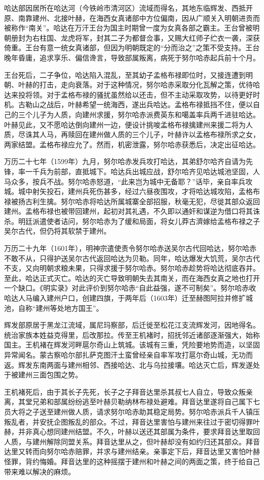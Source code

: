 哈达部因居所在哈达河（今铁岭市清河区）流域而得名，其地东临辉发、西抵开原、南靠建州、北接叶赫，在海西女真诸部中方位偏南，因从广顺关入明朝进贡而被称作“南关”。哈达在万汗王台为国主时期曾一度为女真各部之霸主。王台曾被明朝册封为右柱国、龙虎将军，封其二子为都督佥事，又赐大红师子纻衣一袭，深获倚重。王台有意一统女真诸部，但因为明朝既定的“分而治之”之策不受支持。王台晚年昏庸，追求享乐、偏信谗言，导致部属叛离，病死于努尔哈赤起兵前十个月。

王台死后，二子争位，哈达陷入混乱，至其幼子孟格布禄即位时，又接连遭到明朝、叶赫的打击，走向衰落。对于这种情况，努尔哈赤采取分化瓦解之策，优待哈达来投将领。对于孟格布禄的骚扰虽然给以还击，但不主动采取攻势，以待更好时机。古勒山之战后，叶赫希望一统海西，遂出兵哈达。孟格布禄抵挡不住，便以自己的三个儿子为人质，向建州求援，努尔哈赤派费英东和噶盖率兵两千进驻哈达。叶赫见此，又不愿哈达倒向建州一边，便设计挑唆孟格布禄擒建州来援二将为人质，尽诛其人马，再赎回在建州做人质的三个儿子，叶赫许以孟格布禄所求之女，两家结盟。孟格布禄应允了。然而，机密泄露，努尔哈赤获悉后，决定出征哈达。

万历二十七年（1599年）九月，努尔哈赤发兵攻打哈达，其弟舒尔哈齐自请为先锋，率一千兵为前部，直抵城下。哈达兵出城应战，舒尔哈齐见哈达城池坚固，人马众多，按兵不战。努尔哈赤怒道，“此来岂为城中无备耶？”话毕，亲自率兵攻城。城中射矢投石，建州兵死伤甚多，经过六昼夜围攻，才将哈达城攻陷，孟格布禄被扬古利生擒。努尔哈赤将哈达所属城寨全部招服，秋毫无犯，尽徙其部众返回建州。孟格布禄也被带回建州，起初对其礼遇，不久即以通奸和谋逆为借口将其诛杀。明廷派遣使者诘问，努尔哈赤为了缓和局面，将女儿莽古濟嫁给孟格布禄之子吴尔古代，但仍将其软禁于建州。

万历二十九年（1601年），明神宗遣使责令努尔哈赤送吴尔古代回哈达，努尔哈赤不敢不从，只得护送吴尔古代返回哈达为贝勒。同年，哈达爆发大饥荒，吴尔古代不支，又向明朝求粮未果，只得求援于努尔哈赤。努尔哈赤趁势将哈达彻底吞并。至此，哈达正式灭亡。哈达的灭亡导致明朝失去其南关，而在海西女真之地也打开一个缺口。《明实录》对此评价到努尔哈赤“自此益强，遂不可制矣”。努尔哈赤收哈达人马编入建州户口，创建四旗，于两年后（1603年）迁至赫图阿拉并修扩城池，自称“建州等处地方国王”。

辉发部原居于黑龙江流域，属尼玛察部，后迁徙至松花江支流辉发河，因地得名。统治家族本姓益克得里，后改那拉。传至王机褚时，招抚邻近诸部逐渐强大，始称国主。王机褚在辉发河畔扈尔奇山上筑城。该城有三重，凭险要地势而造，以坚固异常闻名。蒙古察哈尔部扎萨克图汗土蛮曾经亲自率军攻打扈尔奇山城，无功而返。辉发东南两面与建州相邻、西接哈达、北与乌拉接壤。哈达灭亡后，辉发遂处于被建州三面包围之势。

王机褚死后，由于其长子先死，长子之子拜音达里杀其叔七人自立，导致众叛亲离，其堂兄弟和部属纷纷逃至叶赫贝勒纳林布禄处避难。拜音达里遂将自己属下七员大将之子送至建州做人质，请求努尔哈赤助其稳定局势。努尔哈赤派兵千人镇压叛乱者，并安抚企图叛乱的部众。不过，拜音达里害怕与建州来往过于密切得罪叶赫，并非真心想同建州结盟。不久，叶赫以送还其部属为条件，要求拜音达里取回人质，与建州解除同盟关系。拜音达里从之，但叶赫却没有如约归还其部众。拜音达里又转而向努尔哈赤赔罪，并求与建州结亲。亲事定下后，拜音达里又害怕叶赫怪罪，背约悔婚。拜音达里的这种摇摆于建州和叶赫之间的两面之策，终于给自己带来难以解决的麻烦。

